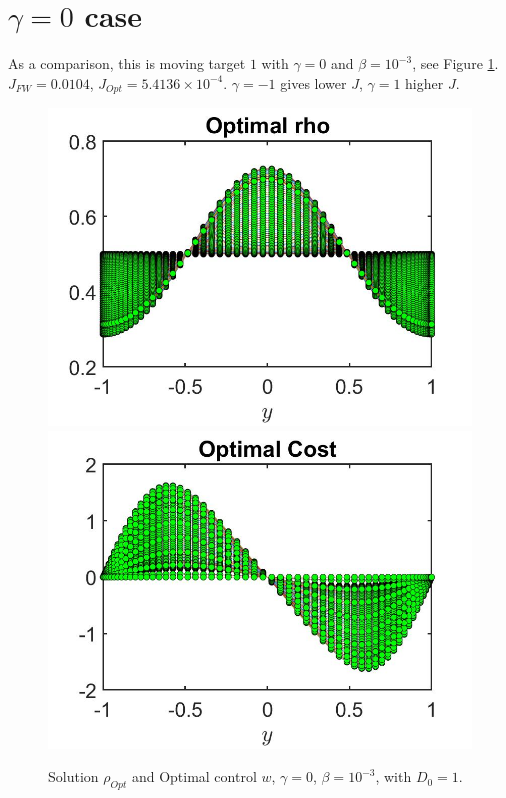 \documentclass[11pt, a4paper]{article}
\theoremstyle{definition}
\begin{document}
	
	
\section{$\gamma = 0$ case}
As a comparison, this is moving target $1$ with $\gamma =0$ and $\beta = 10^{-3}$, see Figure \ref{rhog1}. $J_{FW} = 0.0104$, $J_{Opt} = 5.4136 \times 10^{-4}$. $\gamma = -1$ gives lower $J$, $\gamma = 1$ higher $J$.
\begin{figure}[h]
	\includegraphics[scale=0.3]{rhoOptg1.jpg}
	\includegraphics[scale=0.3]{wOptg1.jpg}
	\caption{Solution $\rho_{Opt}$ and Optimal control $w$, $\gamma = 0$, $\beta = 10^{-3}$, with $D_0 = 1$.}
	\label{rhog1}
\end{figure}
	
\end{document}
